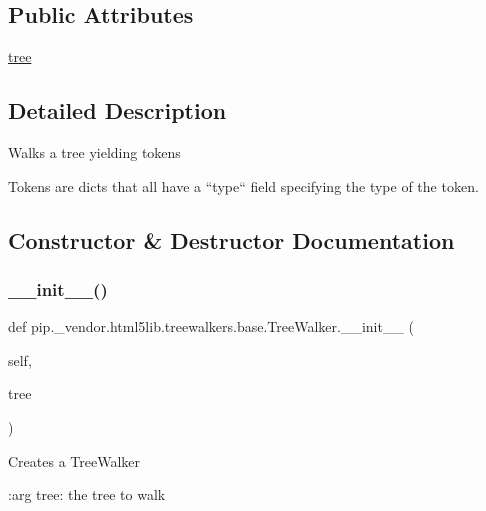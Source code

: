 \subsection*{Public Attributes}
\begin{DoxyCompactItemize}
\item 
\hyperlink{classpip_1_1__vendor_1_1html5lib_1_1treewalkers_1_1base_1_1TreeWalker_a687cbb77f22cf4bd25d91dc52e8da681}{tree}
\end{DoxyCompactItemize}


\subsection{Detailed Description}
\begin{DoxyVerb}Walks a tree yielding tokens

Tokens are dicts that all have a ``type`` field specifying the type of the
token.\end{DoxyVerb}
 

\subsection{Constructor \& Destructor Documentation}
\mbox{\label{classpip_1_1__vendor_1_1html5lib_1_1treewalkers_1_1base_1_1TreeWalker_a5f107b49def5929a4c0aa39b4db7196f}} 
\subsubsection{\texorpdfstring{\+\_\+\+\_\+init\+\_\+\+\_\+()}{\_\_init\_\_()}}
{\footnotesize\ttfamily def pip.\+\_\+vendor.\+html5lib.\+treewalkers.\+base.\+Tree\+Walker.\+\_\+\+\_\+init\+\_\+\+\_\+ (\begin{DoxyParamCaption}\item[{}]{self,  }\item[{}]{tree }\end{DoxyParamCaption})}

\begin{DoxyVerb}Creates a TreeWalker

:arg tree: the tree to walk\end{DoxyVerb}
 

